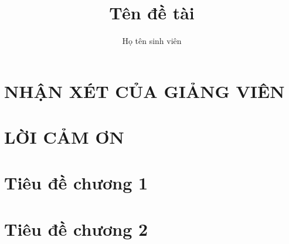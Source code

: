\documentclass[a4paper,12pt,oneside]{report}
\title{Tên đề tài}						%
\author{Họ tên sinh viên}				%
\begin{document}


\chapter*{NHẬN XÉT CỦA GIẢNG VIÊN}


\chapter*{LỜI CẢM ƠN}


\tableofcontents
\listoffigures
\listoftables

\clearpage
{}			%
\chapter{Tiêu đề chương 1}

\chapter{Tiêu đề chương 2}


{}

\end{document}
